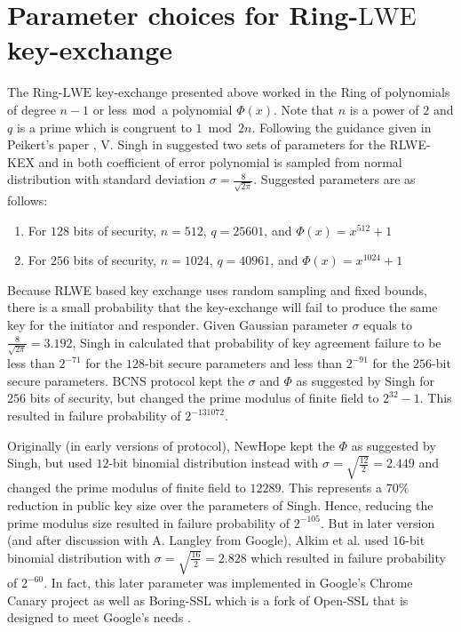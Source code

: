 \section{Parameter choices for Ring-\texorpdfstring{$\mathrm{LWE}$}{LWE} key-exchange}
The Ring-$\mathrm{LWE}$ key-exchange presented above worked in the Ring of polynomials of degree $n-1$ or less $\bmod$ a polynomial $\Phi(x)$. Note that $n$ is a power of $2$ and $q$ is a prime which is congruent to $1 \bmod 2n$. Following the guidance given in Peikert's paper \cite{peikert2014lattice}, V. Singh in \cite{vikramsingh2015} suggested two sets of parameters for the RLWE-KEX and in both coefficient of error polynomial is sampled from normal distribution with standard deviation $\sigma = \frac{8}{\sqrt{2\pi}}$. Suggested parameters are as follows:

\begin{enumerate}
    \item For $128$ bits of security, $n = 512$, $q = 25601$, and $\Phi(x) = x^{512} + 1$
    \item For $256$ bits of security, $n = 1024$, $q = 40961$, and $\Phi(x) = x^{1024} + 1$
\end{enumerate}

Because RLWE based key exchange uses random sampling and fixed bounds, there is a small probability that the key-exchange will fail to produce the same key for the initiator and responder. Given Gaussian parameter $\sigma$ equals to $\frac{8}{\sqrt{2 \pi}} = 3.192$, Singh in \cite{vikramsingh2015} calculated that probability of key agreement failure to be less than $2^{-71}$ for the $128$-bit secure parameters and less than $2^{-91}$ for the $256$-bit secure parameters. $\mathrm{BCNS}$ protocol kept the $\sigma$ and $\Phi$ as suggested by Singh for $256$ bits of security, but changed the prime modulus of finite field to $2^{32}-1$. This resulted in failure probability of $2^{-131072}$. 

Originally (in early versions of protocol), $\mathrm{NewHope}$ kept the $\Phi$ as suggested by Singh, but used $12$-bit binomial distribution instead with $\sigma = \sqrt{\frac{12}{2}} = 2.449$ and changed the prime modulus of finite field to $12289$. This represents a $70\%$ reduction in public key size over the parameters of Singh. Hence, reducing the prime modulus size resulted in failure probability of $2^{-105}$. But in later version (and after discussion with A. Langley from Google), Alkim et al. used $16$-bit binomial distribution with $\sigma = \sqrt{\frac{16}{2}} = 2.828$ which resulted in failure probability of $2^{-60}$. In fact, this later parameter was implemented in Google's Chrome Canary project as well as Boring-SSL which is a fork of Open-SSL that is designed to meet Google's needs \cite{braithwaite_2016}.

